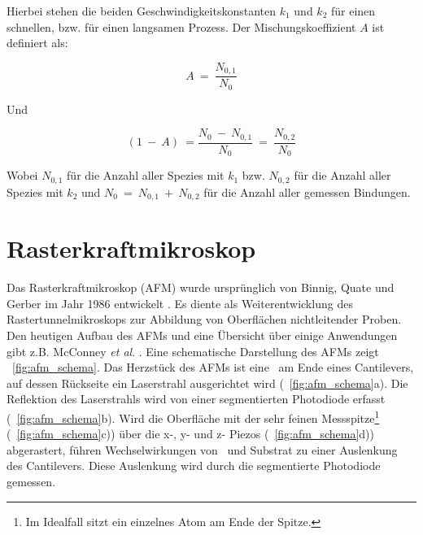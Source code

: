 Hierbei stehen die beiden Geschwindigkeitskonstanten $k_1$ und $k_2$ für einen schnellen, bzw. für einen langsamen Prozess. Der Mischungskoeffizient $A$ ist definiert als:

\[ A~=~\frac{N_{0,1}}{N_0} \]

Und

\[ (1~-~A)~=\frac{N_0~-~N_{0,1}}{N_0}~=~\frac{N_{0,2}}{N_0} \]

Wobei $N_{0,1}$ für die Anzahl aller Spezies mit $k_1$ bzw. $N_{0,2}$ für die Anzahl aller Spezies mit $k_2$ und $N_0~=~N_{0,1}~+~N_{0,2}$ für die Anzahl aller gemessen Bindungen.

\section{Rasterkraftmikroskop}
\label{sec:rasterkraftmikroskop}

Das Rasterkraftmikroskop (\ac{AFM}) wurde ursprünglich von Binnig, Quate und Gerber im Jahr 1986 entwickelt \cite{Binnig.1986}. Es diente als Weiterentwicklung des Rastertunnelmikroskops zur Abbildung von Oberflächen nichtleitender Proben. Den heutigen Aufbau des \acp{AFM} und eine Übersicht über einige Anwendungen gibt z.B. McConney \textit{et al}. \cite{McConney.2010}. Eine schematische Darstellung des \acp{AFM} zeigt \abb~\ref{fig:afm_schema}. Das Herzstück des \acp{AFM} ist eine \spitze~am Ende eines Cantilevers, auf dessen Rückseite ein Laserstrahl ausgerichtet wird (\abb~\ref{fig:afm_schema}a). Die Reflektion des Laserstrahls wird von einer segmentierten Photodiode erfasst (\abb~\ref{fig:afm_schema}b). Wird die Oberfläche mit der sehr feinen Messspitze\footnote{Im Idealfall sitzt ein einzelnes Atom am Ende der Spitze.}  (\abb~\ref{fig:afm_schema}c)) über die x-, y- und z- Piezos (\abb~\ref{fig:afm_schema}d)) abgerastert, führen Wechselwirkungen von \spitze~und Substrat zu einer Auslenkung des Cantilevers. Diese Auslenkung wird durch die segmentierte Photodiode gemessen.\\

